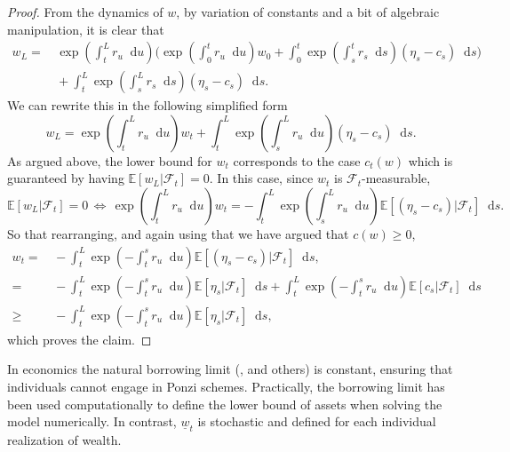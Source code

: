 \documentclass[11pt,oneside,english,reqno,dvipsnames,table]{amsart}
\numberwithin{equation}{section}
\theoremstyle{plain}
\theoremstyle{definition}
\theoremstyle{remark}
\theoremstyle{plain}
\theoremstyle{plain}
\theoremstyle{plain}
\theoremstyle{plain}
\theoremstyle{plain}
\theoremstyle{plain}
\theoremstyle{plain}
\newcommand{\cF}{\mathcal{F}}
\newcommand{\EE}{\mathbb{E}}
\newcommand{\PP}{\mathbb{P}}
\newcommand{\dd}{\mathop{}\!\mathrm{d}}
\newcommand{\mcF}{\mathcal{F}}
\newcommand{\mbE}{\mathbb{E}}
\numberwithin{thm}{section}
\begin{document}
\begin{proof}
From the dynamics of $w$, by variation of constants and a bit of algebraic manipulation, it is clear that 
%
\begin{align*}
    w_L = &\, \exp\left(\int_t^L r_u \dd u \right)\bigg(\exp\left(\int_0^t r_u \dd u \right) w_0 
    +\int_0^t \exp\left(\int_s^t r_s \dd s\right) (\eta_s- c_s)\dd s\bigg) 
    \\
    &\, +\int_t^L \exp\left(\int_s^L r_s \dd s\right) (\eta_s- c_s)\dd s.
\end{align*}
%
We can rewrite this in the following simplified form 
%
\begin{equation*}
    w_L = \exp\left(\int_t^L r_u \dd u \right) w_t +\int_t^L \exp\left(\int_s^L r_u \dd u\right) (\eta_s- c_s)\dd s.  
\end{equation*}
%
As argued above, the lower bound for $w_t$ corresponds to the case $c_t(w)$ which is guaranteed by having $\mbE[w_L|\mcF_t] =0$. In this case, since $w_t$ is $\mcF_t$-measurable,
%
\begin{equation*}
    \EE[w_L|\cF_t]= 0 \, \Longleftrightarrow \, \exp\left(\int_t^L r_u \dd u \right) w_t=-\int_t^L \exp\left(\int_s^L r_u \dd u\right)\EE[ (\eta_s- c_s)|\cF_t]\dd s. 
\end{equation*}
%
So that rearranging, and again using that we have argued  that $c(w)\geq 0$, 
%
\begin{align*}
    w_t = &\, -\int_t^L \exp\left(-\int_t^s r_u \dd u\right)\EE[ (\eta_s- c_s)|\cF_t]\dd s, \\
    =&\, -\int_t^L \exp\left(-\int_t^s r_u \dd u\right)\EE[\eta_s|\cF_t]\dd s  + \int_t^L \exp\left(-\int_t^s r_u \dd u\right)\EE[c_s|\cF_t]\dd s\\
    \geq &\, -\int_t^L \exp\left(-\int_t^s r_u \dd u\right)\EE[\eta_s|\cF_t]\dd s,
\end{align*}
%
which proves the claim.
%
\end{proof}

In economics the natural borrowing limit (\cite{aiyagari_94_uninsured}, \cite{achdou_han_lasry_lions_moll_21_income} and others) is constant, ensuring that individuals cannot engage in Ponzi schemes. Practically, the borrowing limit has been used computationally to define the lower bound of assets when solving the model numerically. In contrast, $\underline{w}_t$ is stochastic and defined for each individual realization of wealth.
\end{document}
